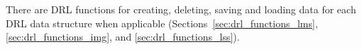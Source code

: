There are \ac{DRL} functions for creating, deleting, saving and loading data for each \ac{DRL} data structure when applicable (Sections~\ref{sec:drl_functions_lms}, \ref{sec:drl_functions_img}, and \ref{sec:drl_functions_lss}).










